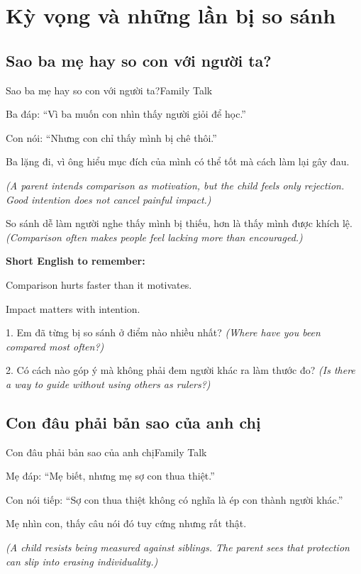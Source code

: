 \chapter{Kỳ vọng và những lần bị so sánh}

\section{Sao ba mẹ hay so con với người ta?}
\begin{truyen}{Sao ba mẹ hay so con với người ta?}{Family Talk}

Ba đáp: ``Vì ba muốn con nhìn thấy người giỏi để học.''

Con nói: ``Nhưng con chỉ thấy mình bị chê thôi.''

Ba lặng đi, vì ông hiểu mục đích của mình có thể tốt mà cách làm lại gây đau.

\textit{(A parent intends comparison as motivation, but the child feels only rejection. Good intention does not cancel painful impact.)}
\end{truyen}

\begin{baihoc}
So sánh dễ làm người nghe thấy mình bị thiếu, hơn là thấy mình được khích lệ.
\textit{(Comparison often makes people feel lacking more than encouraged.)}
\end{baihoc}

\begin{ghinhoanh}
\textbf{Short English to remember:}

Comparison hurts faster than it motivates.

Impact matters with intention.
\end{ghinhoanh}

\begin{tuhocnhanh}
1. Em đã từng bị so sánh ở điểm nào nhiều nhất? \textit{(Where have you been compared most often?)}

2. Có cách nào góp ý mà không phải đem người khác ra làm thước đo? \textit{(Is there a way to guide without using others as rulers?)}
\end{tuhocnhanh}
\ngancach

\section{Con đâu phải bản sao của anh chị}
\begin{truyen}{Con đâu phải bản sao của anh chị}{Family Talk}

Mẹ đáp: ``Mẹ biết, nhưng mẹ sợ con thua thiệt.''

Con nói tiếp: ``Sợ con thua thiệt không có nghĩa là ép con thành người khác.''

Mẹ nhìn con, thấy câu nói đó tuy cứng nhưng rất thật.

\textit{(A child resists being measured against siblings. The parent sees that protection can slip into erasing individuality.)}
\end{truyen}


